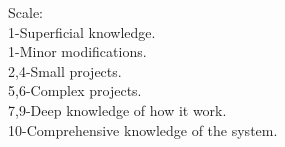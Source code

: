 \documentclass[A4]{deedy-resume} %
\begin{document}
\begin{minipage}[t]{0.32\textwidth}
\vspace*{0.5cm}

Scale:\\
\scriptsize 
1-Superficial knowledge.\\
1-Minor modifications.\\
2,4-Small projects.\\
5,6-Complex projects.\\
7,9-Deep knowledge of how it work.\\
10-Comprehensive knowledge of the system.
\sectionspace %





\end{minipage} %
\hfill
%
%
\end{document}
